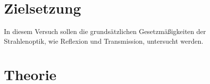 \section{Zielsetzung}
In diesem Versuch sollen die grundsätzlichen Gesetzmäßigkeiten der Strahlenoptik, wie Reflexion und Transmission,
untersucht werden.

\section{Theorie}
\label{sec:Theorie}
